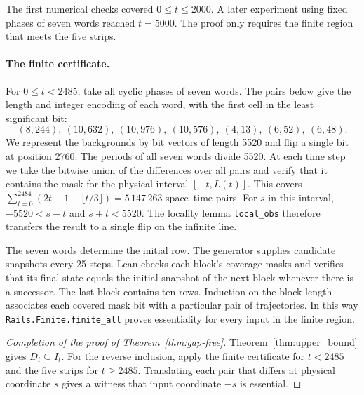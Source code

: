 The first numerical checks covered $0\le t\le2000$. A later experiment using fixed phases of seven words reached $t=5000$. The proof only requires the finite region that meets the five strips.

\paragraph{The finite certificate.}
For $0\le t<2485$, take all cyclic phases of seven words. The pairs below give the length and integer encoding of each word, with the first cell in the least significant bit:
\[
(8,244),\ (10,632),\ (10,976),\ (10,576),\ (4,13),\ (6,52),\ (6,48).
\]
We represent the backgrounds by bit vectors of length 5520 and flip a single bit at position 2760. The periods of all seven words divide 5520. At each time step we take the bitwise union of the differences over all pairs and verify that it contains the mask for the physical interval $[-t,L(t)]$. This covers $\sum_{t=0}^{2484}(2t+1-\lfloor t/3\rfloor)=5\,147\,263$ space--time pairs. For $s$ in this interval, $-5520<s-t$ and $s+t<5520$. The locality lemma \texttt{local\_obs} therefore transfers the result to a single flip on the infinite line.

The seven words determine the initial row. The generator supplies candidate snapshots every 25 steps. Lean checks each block's coverage masks and verifies that its final state equals the initial snapshot of the next block whenever there is a successor. The last block contains ten rows. Induction on the block length associates each covered mask bit with a particular pair of trajectories. In this way \texttt{Rails.Finite.finite\_all} proves essentiality for every input in the finite region.

\begin{proof}[Completion of the proof of Theorem~\ref{thm:gap-free}]
Theorem~\ref{thm:upper_bound} gives $D_t\subseteq I_t$. For the reverse inclusion, apply the finite certificate for $t<2485$ and the five strips for $t\ge2485$. Translating each pair that differs at physical coordinate $s$ gives a witness that input coordinate $-s$ is essential.
\end{proof}

